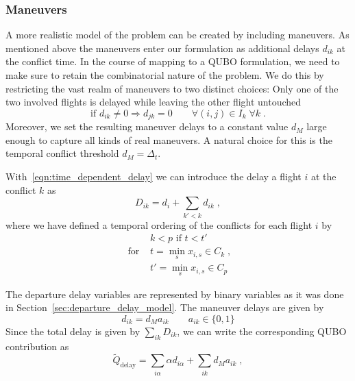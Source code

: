 \subsubsection{Maneuvers}
A more realistic model of the problem can be created by including maneuvers.
As mentioned above the maneuvers enter our formulation as additional delays $d_{ik}$ at the conflict time.
In the course of mapping to a QUBO formulation, we need to make sure to retain the combinatorial nature of the problem.
We do this by restricting the vast realm of maneuvers to two distinct choices:
Only one of the two involved flights is delayed while leaving the other flight untouched
\begin{equation} \label{eqn:maneuver_model_maneuver_decision}
    \text{if } d_{ik} \neq 0 \Rightarrow d_{jk} = 0  \qquad \forall (i, j) \in I_k \; \forall k \; .
\end{equation}
Moreover, we set the resulting maneuver delays to a constant value $d_M$ large enough to capture all kinds of real maneuvers.
A natural choice for this is the temporal conflict threshold $d_M = \Delta_t$.

With~\eqref{eqn:time_dependent_delay} we can introduce the delay a flight $i$ at the conflict $k$ as
\begin{equation} \label{eqn:maneuver_model_delay_at_conflict}
    D_{ik} = d_i + \sum_{k'<k} d_{ik} \; ,
\end{equation}
where we have defined a temporal ordering of the conflicts for each flight $i$ by
\begin{align*}
                 &k < p \text{ if } t < t' \\
    \text{ for } &t = \min_s x_{i, s} \in C_k \; , \\
                 &t' = \min_s x_{i, s} \in C_p
\end{align*}

The departure delay variables are represented by binary variables as it was done in Section~\ref{sec:departure_delay_model}.
The maneuver delays are given by
\begin{equation*}
    d_{ik} = d_M a_{ik} \qquad a_{ik} \in \{0, 1\}
\end{equation*}
Since the total delay is given by $\sum_{ik} D_{ik}$, we can write the corresponding QUBO contribution as
\begin{equation*}
    \tilde Q_\text{delay} = \sum_{i\alpha} \alpha d_{i\alpha}  + \sum_{ik} d_M a_{ik}\; ,
\end{equation*}

